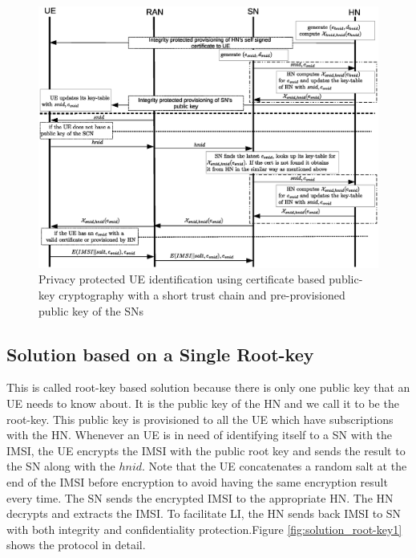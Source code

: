 \documentclass[lnicst,sechang,a4paper]{svmultln}
\begin{document}
\begin{figure}
\begin{center}
  \includegraphics[width=.98\textwidth]{root-key3.eps}
\caption{Privacy protected UE identification using certificate based public-key cryptography with a short trust chain and pre-provisioned public key of the SNs}
\label{fig:solution_certificate_root_key_hybrid}       %
\end{center}
\end{figure}



\subsection{Solution based on a Single Root-key} 
\label{sub_sec:solution_root-key}

This is called root-key based solution because there is only one public key that an UE needs to know about. It is the public key of the HN and we call it to be the root-key. This public key is provisioned to all the UE which have subscriptions with the HN. Whenever an UE is in need of identifying itself to a SN with the IMSI, the UE encrypts the IMSI with the public root key and sends the result to the SN along with the $hnid$. Note that the UE concatenates a random salt at the end of the IMSI before encryption to avoid having the same encryption result every time. The SN sends the encrypted IMSI to the appropriate HN. The HN decrypts and extracts the IMSI. To facilitate LI, the HN sends back IMSI to SN with both integrity and confidentiality protection.Figure \ref{fig:solution_root-key1} shows the protocol in detail.
\end{document}
